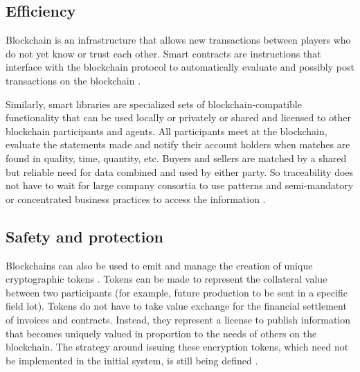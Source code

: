 \subsection{Efficiency}\label{sec:efficiency}
Blockchain is an infrastructure that allows new transactions between players who do not yet know or trust each other. Smart contracts are instructions that interface with the blockchain protocol to automatically evaluate and possibly post transactions on the blockchain \cite{raskin2017law}. 

Similarly, smart libraries are specialized sets of blockchain-compatible functionality that can be used locally or privately or shared and licensed to other blockchain participants and agents. All participants meet at the blockchain, evaluate the statements made and notify their account holders when matches are found in quality, time, quantity, etc. Buyers and sellers are matched by a shared but reliable need for data combined and used by either party. So traceability does not have to wait for large company consortia to use patterns and semi-mandatory or concentrated business practices to access the information \cite{galvez2018future}.

\subsection{Safety and protection}\label{sec:Safety}
Blockchains can also be used to emit and manage the creation of unique cryptographic tokens \cite{nystrom1999pkcs}. Tokens can be made to represent the collateral value between two participants (for example, future production to be sent in a specific field lot). Tokens do not have to take value exchange for the financial settlement of invoices and contracts. Instead, they represent a license to publish information that becomes uniquely valued in proportion to the needs of others on the blockchain. The strategy around issuing these encryption tokens, which need not be implemented in the initial system, is still being defined \cite{galvez2018future}.